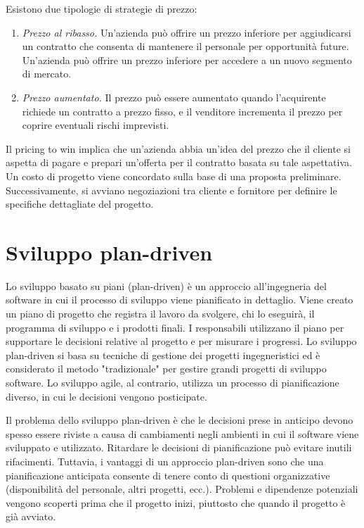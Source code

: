 Esistono due tipologie di strategie di prezzo:
\begin{enumerate}
    \item \textit{Prezzo al ribasso.} Un'azienda può offrire un prezzo inferiore per aggiudicarsi un contratto che consenta di mantenere il personale per opportunità future. Un'azienda può offrire un prezzo inferiore per accedere a un nuovo segmento di mercato.
    \item \textit{Prezzo aumentato.} Il prezzo può essere aumentato quando l'acquirente richiede un contratto a prezzo fisso, e il venditore incrementa il prezzo per coprire eventuali rischi imprevisti.
\end{enumerate}
Il pricing to win implica che un'azienda abbia un'idea del prezzo che il cliente si aspetta di pagare e prepari un'offerta per il contratto basata su tale aspettativa. 
Un costo di progetto viene concordato sulla base di una proposta preliminare. Successivamente, si avviano negoziazioni tra cliente e fornitore per definire le specifiche dettagliate del progetto.

\section{Sviluppo plan-driven}
Lo sviluppo basato su piani (plan-driven) è un approccio all'ingegneria del software in cui il processo di sviluppo viene pianificato in dettaglio. Viene creato un piano di progetto che registra il lavoro da svolgere, chi lo eseguirà, il programma di sviluppo e i prodotti finali. I responsabili utilizzano il piano per supportare le decisioni relative al progetto e per misurare i progressi. Lo sviluppo plan-driven si basa su tecniche di gestione dei progetti ingegneristici ed è considerato il metodo "tradizionale" per gestire grandi progetti di sviluppo software. Lo sviluppo agile, al contrario, utilizza un processo di pianificazione diverso, in cui le decisioni vengono posticipate.

Il problema dello sviluppo plan-driven è che le decisioni prese in anticipo devono spesso essere riviste a causa di cambiamenti negli ambienti in cui il software viene sviluppato e utilizzato. Ritardare le decisioni di pianificazione può evitare inutili rifacimenti. Tuttavia, i vantaggi di un approccio plan-driven sono che una pianificazione anticipata consente di tenere conto di questioni organizzative (disponibilità del personale, altri progetti, ecc.). Problemi e dipendenze potenziali vengono scoperti prima che il progetto inizi, piuttosto che quando il progetto è già avviato.

